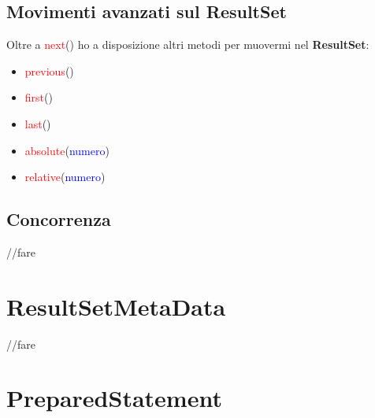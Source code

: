 \documentclass[11pt, letterpaper, titlepage]{article}
\begin{document}
\subsection{Movimenti avanzati sul ResultSet}
Oltre a \textcolor{red}{next}() ho a disposizione altri metodi per muovermi nel \textbf{ResultSet}:
\begin{itemize}
    \item \textcolor{red}{previous}()
    \item \textcolor{red}{first}()
    \item \textcolor{red}{last}()
    \item \textcolor{red}{absolute}(\textcolor{blue}{numero})
    \item \textcolor{red}{relative}(\textcolor{blue}{numero})
\end{itemize}

\subsection{Concorrenza}
//fare

\section{ResultSetMetaData}
//fare

\section{PreparedStatement}
\end{document}
